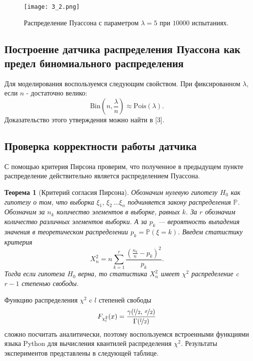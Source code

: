 \documentclass[a4paper, 11pt]{article}
\theoremstyle{def}
\theoremstyle{th}
\newtheorem{theorem}{Теорема}[section]
\theoremstyle{rem}
\newcommand{\p}{\mathbb{P}}
\begin{document}
\begin{figure}[h]
        \centering
        \texttt{[image: 3\_2.png]}
        \caption{Распределение Пуассона с параметром $\lambda = 5$ при $10000$ испытаниях.}
\end{figure}

\subsection{Построение датчика распределения Пуассона как предел биномиального распределения}
Для моделирования воспользуемся следующим свойством. При фиксированном $\lambda$, если $n$ - достаточно велико:
$$
\mbox{Bin}\left(n, \frac{\lambda}{n}\right) \approx \mbox{Pois}(\lambda).
$$
Доказательство этого утверждения можно найти в [3].

\subsection{Проверка корректности работы датчика}

С помощью критерия Пирсона проверим, что полученное в предыдущем пункте распределение действительно является распределением Пуассона.

\begin{theorem}[Критерий согласия Пирсона]
        Обозначим нулевую гипотезу $H_0$ как гипотезу о том, что выборка $\xi_1,\,\xi_2\,\ldots\xi_n$ подчиняется закону распределения $\p$. Обозначим за $n_k$ количество элементов в выборке, равных $k$. За $r$ обозначим количество различных элементов выборки. А за $p_k$ --- вероятность выпадения значения в теоретическом распределении $p_k = \p(\xi = k)$. Введем статистику критерия
$$
        X^2_n = n \sum_{k = 1}^r
        \frac{\left(\frac{n_k}{n} - p_k\right)^2}{p_k}.
$$
        Тогда если гипотеза $H_0$ верна, то статистика $X^2_n$ имеет $\chi^2$ распределение c $r-1$ степенью свободы.
\end{theorem}


    Функцию распределения $\chi^2$ c $l$ степеней свободы
$$
    F_{\chi^2_l}(x) = 
    \frac
    {\gamma(\nicefrac{l}{2},\,\nicefrac{x}{2})}
    {\Gamma(\nicefrac{l}{2})}
$$
сложно посчитать аналитически, поэтому воспользуемся встроенными функциями языка Python для вычисления квантилей распределения $\chi^2$. Результаты экспериментов представлены в следующей таблице.
   
\end{document}
